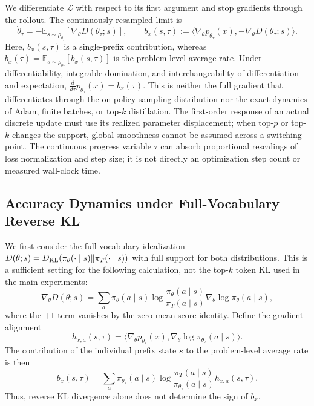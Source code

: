 \documentclass{article}
\theoremstyle{opdplain}
\begin{document}
We differentiate $\mathcal L$ with respect to its first argument and stop gradients through the rollout. The continuously resampled limit is
\[
 \dot\theta_\tau=-\mathbb E_{s\sim\rho_{\theta_\tau}}
 [\nabla_\theta D(\theta_\tau;s)],\qquad
 b_x(s,\tau):=\langle\nabla_\theta p_{\theta_\tau}(x),
 -\nabla_\theta D(\theta_\tau;s)\rangle.
\]
Here, $b_x(s,\tau)$ is a single-prefix contribution, whereas $b_x(\tau)=\mathbb E_{s\sim\rho_{\theta_\tau}}[b_x(s,\tau)]$ is the problem-level average rate.
Under differentiability, integrable domination, and interchangeability of differentiation and expectation, $\frac{d}{d\tau}p_{\theta_\tau}(x)=b_x(\tau)$. This is neither the full gradient that differentiates through the on-policy sampling distribution nor the exact dynamics of Adam, finite batches, or top-$k$ distillation. The first-order response of an actual discrete update must use its realized parameter displacement; when top-$p$ or top-$k$ changes the support, global smoothness cannot be assumed across a switching point. The continuous progress variable $\tau$ can absorb proportional rescalings of loss normalization and step size; it is not directly an optimization step count or measured wall-clock time.

\subsection{Accuracy Dynamics under Full-Vocabulary Reverse KL}
\label{app:opd-reverse-kl}

We first consider the full-vocabulary idealization $D(\theta;s)=D_{\rm KL}(\pi_\theta(\cdot\mid s)\|\pi_T(\cdot\mid s))$ with full support for both distributions. This is a sufficient setting for the following calculation, not the top-$k$ token KL used in the main experiments:
\[
 \nabla_\theta D(\theta;s)=\sum_a\pi_\theta(a\mid s)
 \log\frac{\pi_\theta(a\mid s)}{\pi_T(a\mid s)}
 \nabla_\theta\log\pi_\theta(a\mid s),
\]
where the $+1$ term vanishes by the zero-mean score identity. Define the gradient alignment
\[
 h_{x,a}(s,\tau)=\langle\nabla_\theta p_{\theta_\tau}(x),
 \nabla_\theta\log\pi_{\theta_\tau}(a\mid s)\rangle.
\]
The contribution of the individual prefix state $s$ to the problem-level average rate is then
\[
 b_x(s,\tau)=\sum_a\pi_{\theta_\tau}(a\mid s)
 \log\frac{\pi_T(a\mid s)}{\pi_{\theta_\tau}(a\mid s)}h_{x,a}(s,\tau).
\]
Thus, reverse KL divergence alone does not determine the sign of $b_x$.
\end{document}
